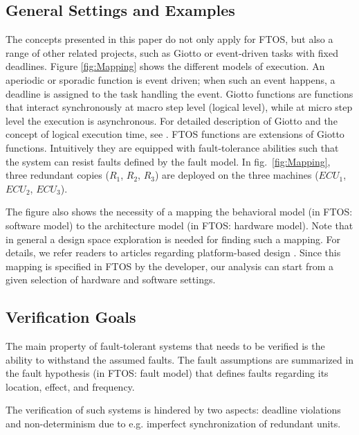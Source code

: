\documentclass[10pt, a4paper, onecolumn, conference, compsocconf]{IEEEtran}
\begin{document}
\subsection{General Settings and Examples}
The concepts presented in this paper do not only apply for FTOS, but also a range of other related projects, such as Giotto \cite{Henzinger01giotto:a} or event-driven tasks with fixed deadlines. Figure \ref{fig:Mapping} shows the different models of execution. An aperiodic or sporadic function is event driven; when such an event happens, a deadline is assigned to the task handling the event. Giotto functions are functions that interact synchronously at macro step level (logical level), while at micro step level the execution is asynchronous. For detailed description of Giotto and the concept of logical execution time, see \cite{Henzinger01giotto:a}. FTOS functions are extensions of Giotto functions. Intuitively they are equipped with fault-tolerance abilities such that the system can resist faults defined by the fault model. In fig.~\ref{fig:Mapping}, three redundant copies ($R_1$, $R_2$, $R_3$) are deployed on the three machines ($ECU_1$, $ECU_2$, $ECU_3$).

The figure also shows the necessity of a mapping the behavioral model (in FTOS: software model) to the architecture model (in FTOS: hardware model). Note that in general a design space exploration is needed for finding such a mapping. For details, we refer readers to articles regarding platform-based design \cite{sangiovannivincentelli:2001:pbd}. Since this mapping is specified in FTOS by the developer, our analysis can start from a given selection of hardware and software settings.

\subsection{Verification Goals\label{subsec.Verification.Goals}}
The main property of fault-tolerant systems that needs to be verified is the ability to withstand the assumed faults. The fault assumptions are summarized in the fault hypothesis (in FTOS: fault model) that defines faults regarding its location, effect, and frequency.

The verification of such systems is hindered by two aspects: deadline violations and non-determinism due to e.g. imperfect synchronization of redundant units.
\end{document}
